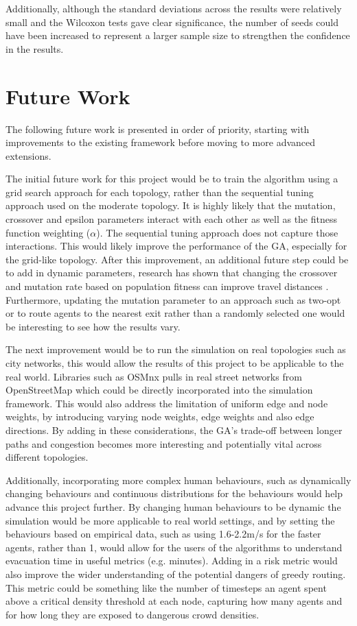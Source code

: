 \documentclass[12pt,a4paper]{report}
\begin{document}
Additionally, although the standard deviations across the results were relatively small and the Wilcoxon tests gave clear significance, the number of seeds could have been increased to represent a larger sample size to strengthen the confidence in the results.

\section{Future Work}
The following future work is presented in order of priority, starting with improvements to the existing framework before moving to more advanced extensions.

The initial future work for this project would be to train the algorithm using a grid search approach for each topology, rather than the sequential tuning approach used on the moderate topology. It is highly likely that the mutation, crossover and epsilon parameters interact with each other as well as the fitness function weighting ($\alpha$). The sequential tuning approach does not capture those interactions. This would likely improve the performance of the GA, especially for the grid-like topology. After this improvement, an additional future step could be to add in dynamic parameters, research has shown that changing the crossover and mutation rate based on population fitness can improve travel distances \citep{LI_2023_ADAPTIVE_RATES}. Furthermore, updating the mutation parameter to an approach such as two-opt or to route agents to the nearest exit rather than a randomly selected one would be interesting to see how the results vary.

The next improvement would be to run the simulation on real topologies such as city networks, this would allow the results of this project to be applicable to the real world. Libraries such as OSMnx pulls in real street networks from OpenStreetMap which could be directly incorporated into the simulation framework. This would also address the limitation of uniform edge and node weights, by introducing varying node weights, edge weights and also edge directions. By adding in these considerations, the GA’s trade-off between longer paths and congestion becomes more interesting and potentially vital across different topologies.

Additionally, incorporating more complex human behaviours, such as dynamically changing behaviours and continuous distributions for the behaviours would help advance this project further. By changing human behaviours to be dynamic the simulation would be more applicable to real world settings, and by setting the behaviours based on empirical data, such as using 1.6-2.2m/s for the faster agents, rather than 1, would allow for the users of the algorithms to understand evacuation time in useful metrics (e.g. minutes). Adding in a risk metric would also improve the wider understanding of the potential dangers of greedy routing. This metric could be something like the number of timesteps an agent spent above a critical density threshold at each node, capturing how many agents and for how long they are exposed to dangerous crowd densities.
\end{document}
